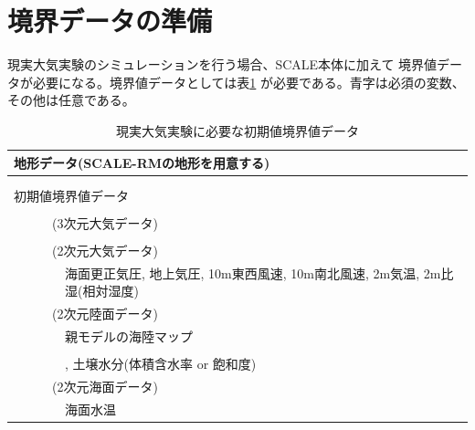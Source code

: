\section{境界データの準備}

現実大気実験のシミュレーションを行う場合、SCALE本体に加えて
境界値データが必要になる。境界値データとしては表\ref{tab:real_bnd}
が必要である。{\color{blue}青字}は必須の変数、その他は任意である。

\begin{table}[h]
\begin{center}
  \caption{現実大気実験に必要な初期値境界値データ}
  \label{tab:real_bnd}
  \begin{tabularx}{150mm}{llX} \hline
    \multicolumn{3}{l}{地形データ(SCALE-RMの地形を用意する)}\\ \hline
    & \multicolumn{2}{l}{\color{blue}{標高データ}}\\
    & \multicolumn{2}{l}{\color{blue}{土地利用データ}}\\ \hline
    \multicolumn{3}{l}{初期値境界値データ}\\ \hline
    &  \multicolumn{2}{l}{\color{blue}{親モデルの緯度・経度}}\\
    &  \multicolumn{2}{l}{(3次元大気データ)}\\
    & &  \multicolumn{1}{l}{\color{blue}{東西風速, 南北風速, 気温, 比湿(相対湿度), 気圧, ジオポテンシャル高度}} \\
    &  \multicolumn{2}{l}{(2次元大気データ)}\\
    & & 海面更正気圧, 地上気圧, 10m東西風速, 10m南北風速, 2m気温, 2m比湿(相対湿度) \\
    &  \multicolumn{2}{l}{(2次元陸面データ)}\\
    & &  \multicolumn{1}{l}{親モデルの海陸マップ}\\
    & &  \multicolumn{1}{l}{\color{blue}{地表面温度}}\\
    & &  \multicolumn{1}{l}{{\color{blue}{親モデル土壌データの深さ情報, 土壌温度}}, 土壌水分(体積含水率 or 飽和度)}\\
    &  \multicolumn{2}{l}{(2次元海面データ)}\\
　　& &  \multicolumn{1}{l}{海面水温}\\ \hline
  \end{tabularx}
\end{center}
\end{table}


